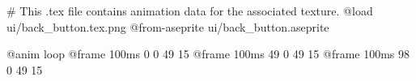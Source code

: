 # This .tex file contains animation data for the associated texture.
@load ui/back_button.tex.png
@from-aseprite ui/back_button.aseprite

@anim loop
	@frame 100ms 0 0 49 15
	@frame 100ms 49 0 49 15
	@frame 100ms 98 0 49 15
